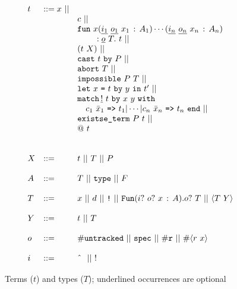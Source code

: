 \documentclass[9pt,natbib]{sigplanconf}
\newcommand{\Eq}[0]{\texttt{=}}
\newcommand{\bang}[0]{\texttt{!}}
\begin{document}
\begin{figure}
\[
\begin{array}{lll}
t & ::= x\ ||\\
\ & \ &   c\ ||\\ 
\ & \ &    \texttt{fun}\ x(\underline{i_1}\ \underline{o_1}\ x_1\,:\,A_1)\cdots(\underline{i_n}\ \underline{o_n}\ x_n\,:\, A_n)\\
\ & \ & \ \ \ \ \ \ \  : \underline{o}\ T .\ t\ ||\\
\ & \ &    (t\ X)\ || \\ 
\ & \ &         \texttt{cast}\ t\ \texttt{by}\ P  \ ||\\
\ & \ &  \texttt{abort}\ T\ ||\\ 
\ & \ &  \texttt{impossible}\ P\ T\ ||\\ 
\ & \ &  \texttt{let}\ x\ \Eq\ t\ \texttt{by}\ y\ \texttt{in}\ t' \ ||\ 
\\ 
\ & \ &  \texttt{match}\, \underline{!}\ t\ \texttt{by}\ x\ y \ \texttt{with}\\
\ & \ &  \ \ \ c_1\ \bar{x}_1\ \texttt{=>}\ t_1 |
 \cdots | c_n\ \bar{x}_n\ \texttt{=>}\ t_n\ \texttt{end}\ ||\\
\ & \ &  \texttt{existse\_term}\ P\ t\ || \\
\ & \ &  @\ t \\
\\
\\
X & ::= & t\ ||\ T\ ||\ P
\\
\\
A & ::= & T\ ||\ \texttt{type}\ ||\ F 
\\
\\
T & ::= & x\ ||\ d\ ||\ \bang\ ||\ 
     \texttt{Fun}(i?\ o?\ x\,:\,A) . o?\ T\ ||\ \langle T\ Y\rangle 
\\
\\
Y & ::= & t\ ||\ T
\\
\\
o & ::= & \#\texttt{untracked}\ ||\ \texttt{spec}\ ||\ \#\texttt{r}\ ||\ \#\langle r\ x\rangle
\\
\\
i & ::= & \textnormal{\^{\ }}\ ||\ !\ 
\end{array}
\]
\caption{\label{fig:terms} Terms ($t$) and types ($T$); underlined occurrences are optional}
\end{figure}
\end{document}
